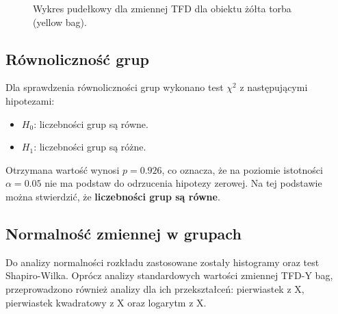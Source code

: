     \begin{figure}[H]
        \centering
        \label{fig:boxTFD_yBag}
        \caption{Wykres pudełkowy dla zmiennej TFD dla obiektu żółta torba (yellow bag).}
    \end{figure}

    \subsection{Równoliczność grup}
    Dla sprawdzenia równoliczności grup wykonano test $\chi^2$ z następującymi hipotezami:
    \begin{itemize}
        \item $H_0$: liczebności grup są równe.
        \item $H_1$: liczebności grup są różne.
    \end{itemize}
    Otrzymana wartość wynosi \textbf{$p=0.926$}, co oznacza, że na poziomie istotności $\alpha=0.05$
    nie ma podstaw do odrzucenia hipotezy zerowej. Na tej podstawie można stwierdzić, że \textbf{liczebności grup są równe}.
    

    \subsection{Normalność zmiennej w grupach}
    Do analizy normalności rozkładu zastosowane zostały histogramy oraz test Shapiro-Wilka. Oprócz analizy standardowych wartości
    zmiennej TFD-Y bag, przeprowadzono również analizy dla ich przekształceń: pierwiastek z X, pierwiastek kwadratowy z X oraz logarytm z X.

